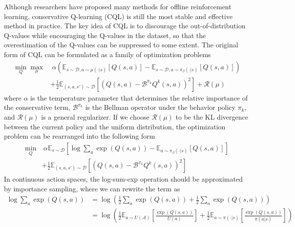 Although researchers have proposed many methods for offline reinforcement learning, conservative Q-learning (CQL) \cite{kumar2020conservative} is still the most stable and effective method in practice. The key idea of CQL is to discourage the out-of-distribution Q-values while encouraging the Q-values in the dataset, so that the overestimation of the Q-values can be suppressed to some extent. The original form of CQL can be formulated as a family of optimization problems
\begin{equation}
    \begin{aligned}
        \min_Q \max_{\mu} &\ \alpha \left( \mathbb{E}_{s \sim \mathcal{D}, a \sim \mu(\cdot|s)} \left[ Q(s, a) \right] - \mathbb{E}_{s \sim \mathcal{D}, a \sim \pi_{\beta}(\cdot|s)} \left[ Q(s, a) \right] \right) \\
        &+ \frac{1}{2} \mathbb{E}_{(s,a,s') \sim \mathcal{D}} \left[ \left( Q(s, a) - \mathcal{B}^{\pi_k} Q^k(s, a) \right)^2 \right] + \mathcal{R}(\mu)
    \end{aligned}
\end{equation}
where $\alpha$ is the temperature parameter that determines the relative importance of the conservative term, $\mathcal{B}^{\pi_k}$ is the Bellman operator under the behavior policy $\pi_k$, and $\mathcal{R}(\mu)$ is a general regularizer. If we choose $\mathcal{R}(\mu)$ to be the KL divergence between the current policy and the uniform distribution, the optimization problem can be rearranged into the following form
\begin{equation}
    \begin{aligned}
        \min_Q &\ \alpha \mathbb{E}_{s \sim \mathcal{D}} \left[ \log \sum \nolimits_a \exp(Q(s, a)) - \mathbb{E}_{a \sim \pi_{\beta}(\cdot|s)} \left[ Q(s, a) \right] \right] \\
        &+ \frac{1}{2} \mathbb{E}_{(s,a,s') \sim \mathcal{D}} \left[ \left( Q(s, a) - \mathcal{B}^{\pi_k} Q^k(s, a) \right)^2 \right]
    \end{aligned}
\end{equation}
In continuous action spaces, the log-sum-exp operation should be approximated by importance sampling, where we can rewrite the term as
\begin{equation}
    \begin{aligned}
        \log \sum \nolimits_a \exp(Q(s, a)) &= \log \left( \frac{1}{2} \sum \nolimits_a \exp(Q(s, a)) + \frac{1}{2} \sum \nolimits_a \exp(Q(s, a)) \right) \\
        &= \log \left( \frac{1}{2} \mathbb{E}_{a\sim U(\mathcal{A})} \left[ \frac{\exp(Q(s, a))}{U(a)} \right] + \frac{1}{2} \mathbb{E}_{a\sim \pi(\cdot|s)} \left[ \frac{\exp(Q(s, a))}{\pi(a|s)} \right] \right)
    \end{aligned}
\end{equation}
